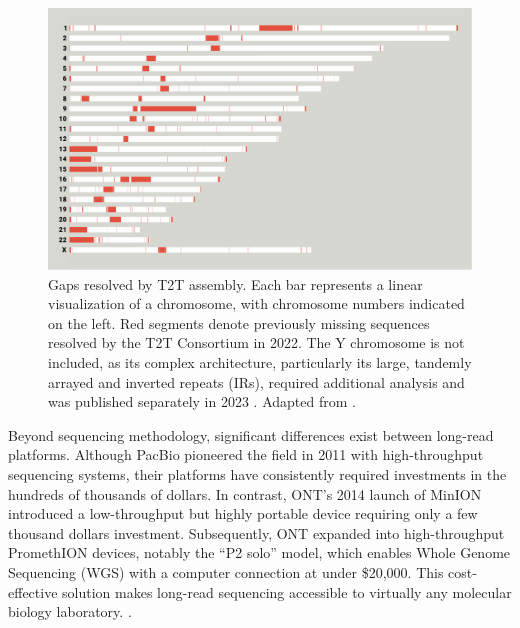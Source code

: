 \begin{figure}[H]
    \centering
    \includegraphics[width=\textwidth]{img/T2T_ref.pdf}
    \caption[Gaps resolved by T2T assembly]{Gaps resolved by T2T assembly. Each 
    bar represents a linear visualization of a chromosome, with chromosome 
    numbers indicated on the left. Red segments denote previously missing 
    sequences resolved by the T2T Consortium in 2022. The Y chromosome is not 
    included, as its complex architecture, particularly its large, tandemly 
    arrayed and inverted repeats (IRs), required additional analysis and was 
    published separately in 2023 \cite{rhie_complete_2023}. Adapted from 
    \cite{zahn_filling_2022}.}
    \label{fig:T2T_ref}
\end{figure}

Beyond sequencing methodology, significant differences exist between long-read 
platforms. Although PacBio pioneered the field in 2011 with high-throughput 
sequencing systems, their platforms have consistently required investments in 
the hundreds of thousands of dollars. In contrast, ONT's 2014 launch of MinION 
introduced a low-throughput but highly portable device requiring only a few 
thousand dollars investment. Subsequently, ONT expanded into high-throughput 
PromethION devices, notably the ``P2 solo'' model, which enables Whole Genome 
Sequencing (WGS) with a computer connection at under \$20,000. This 
cost-effective solution makes long-read sequencing accessible to virtually any 
molecular biology laboratory.
\cite{espinosa_advancements_2024,noauthor_vega_nodate,oxford_nanopore_technologies_nanopore_nodate}.

